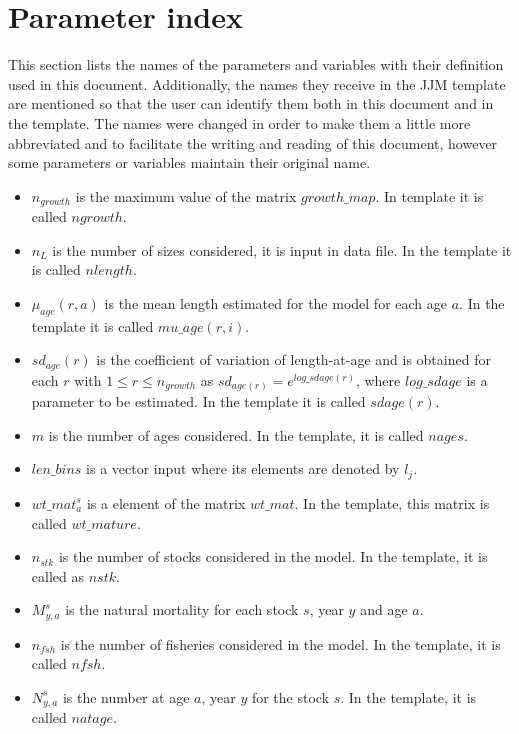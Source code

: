 \documentclass{article}
\begin{document}
\section{Parameter index} \label{ch: parameterindex}
This section lists the names of the parameters and variables with their definition used in this document. Additionally, the names they receive in the JJM template are mentioned so that the user can identify them both in this document and in the template. The names were changed in order to make them a little more abbreviated and to facilitate the writing and reading of this document, however some parameters or variables maintain their original name.
\begin{itemize}
    \item $n_{growth}$ is the maximum value of the matrix $growth\_map$. In template it is called $ngrowth$.
   \item $n_L$ is the number of sizes considered, it is input in data file. In the template it is called $nlength$.
   \item $\mu_{age}(r,a)$ is the mean length estimated for the model for each age $a$. In the template it is called $mu\_age(r,i)$.
   \item $sd_{age}(r)$ is the coefficient of variation of length-at-age and is obtained  for each $r$ with $1\leq r\leq n_{growth}$ as $sd_{age(r)}   = e^{log\_sdage(r)}$, where $log\_sdage$ is a parameter to be estimated. In the template it is called $sdage(r)$.
   \item $m$ is the number of ages considered. In the template, it is called  $nages$.   %
   \item $len\_bins$ is a vector input where its elements are denoted by $l_j$.
    \item $wt\_mat^s_a$ is a element of the matrix $wt\_mat$. In the template, this matrix  is called $wt\_mature$.
    \item $n_{stk}$ is the number of stocks considered in the model. In the template, it is called as $nstk$.
    \item $M^s_{y,a}$ is the natural mortality for each stock $s$, year $y$ and age $a$.
    \item $n_{fsh}$ is the number of fisheries considered in the model. In the template, it is called $nfsh$.
    \item $N^s_{y,{a}}$ is the number at age $a$, year $y$ for the stock $s$. In the template, it is called  $natage$.

\end{itemize}
\end{document}
